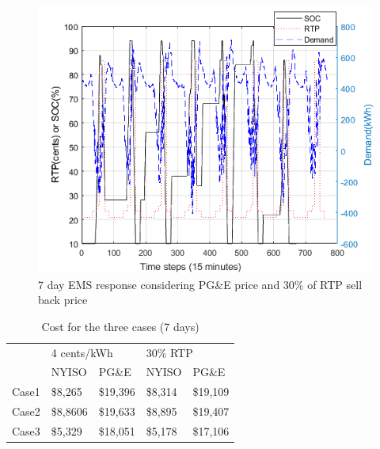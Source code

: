  \begin{figure}[!ht]
    \centering
    \includegraphics[width = \linewidth]{figs/PG_VAR_10_12_30rtp.png}
    \caption{7 day EMS response considering PG\&E price and 30\% of RTP sell back price}
    \label{fig:PG_VAR_10_12_30rtp}
\end{figure}


\begin{table}[htb]
\caption{Cost for the three cases (7 days)}
\label{tab:Cost}
\centering

\begin{tabular}{l|l|l|l|l|}
\cline{2-5}
                            & \multicolumn{2}{l|}{4 cents/kWh} & \multicolumn{2}{l|}{30\% RTP}   \\ \cline{2-5} 
                            & NYISO           & PG\&E          & NYISO          & PG\&E          \\ \hline
\multicolumn{1}{|l|}{Case1} & \$8,265  & \$19,396 & \$8,314 & \$19,109 \\ \hline
\multicolumn{1}{|l|}{Case2} & \$8,8606  & \$19,633 & \$8,895 & \$19,407 \\ \hline
\multicolumn{1}{|l|}{Case3} & \$5,329  & \$18,051 & \$5,178 & \$17,106 \\ \hline
\end{tabular}

\end{table}




